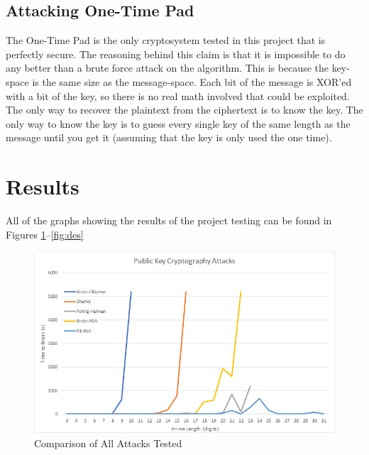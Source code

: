 \documentclass[12pt]{report}
\begin{document}
\subsection{Attacking One-Time Pad}
The One-Time Pad is the only cryptosystem tested in this project that is perfectly secure. The reasoning behind this claim is that it is impossible to do any better than a brute force attack on the algorithm. This is because the key-space is the same size as the message-space. Each bit of the message is XOR'ed with a bit of the key, so there is no real math involved that could be exploited. The only way to recover the plaintext from the ciphertext is to know the key. The only way to know the key is to guess every single key of the same length as the message until you get it (assuming that the key is only used the one time).

\section{Results}
\label{results}

All of the graphs showing the results of the project testing can be found in Figures \ref{fig:allattack}--\ref{fig:des}

\begin{figure}[hp!] %
    \begin{center}
        \includegraphics[width=0.85\linewidth]{AllAttack.PNG}
        \caption{Comparison of All Attacks Tested}
        \label{fig:allattack}
    \end{center}
\end{figure}
\end{document}
